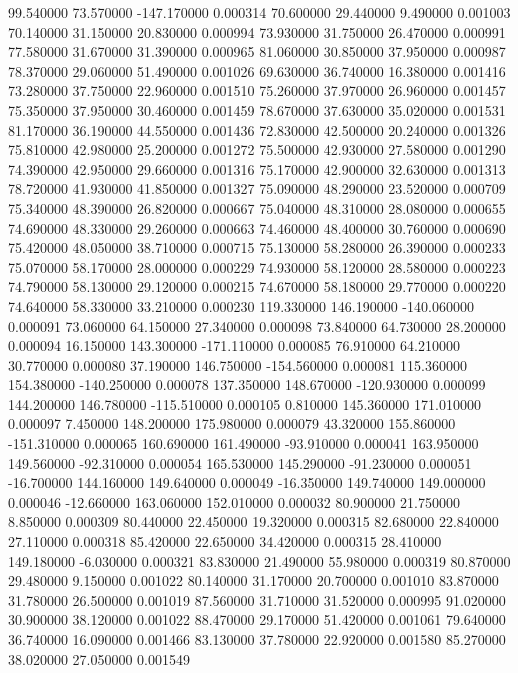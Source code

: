 99.540000 73.570000 -147.170000 0.000314 
70.600000 29.440000 9.490000 0.001003 
70.140000 31.150000 20.830000 0.000994 
73.930000 31.750000 26.470000 0.000991 
77.580000 31.670000 31.390000 0.000965 
81.060000 30.850000 37.950000 0.000987 
78.370000 29.060000 51.490000 0.001026 
69.630000 36.740000 16.380000 0.001416 
73.280000 37.750000 22.960000 0.001510 
75.260000 37.970000 26.960000 0.001457 
75.350000 37.950000 30.460000 0.001459 
78.670000 37.630000 35.020000 0.001531 
81.170000 36.190000 44.550000 0.001436 
72.830000 42.500000 20.240000 0.001326 
75.810000 42.980000 25.200000 0.001272 
75.500000 42.930000 27.580000 0.001290 
74.390000 42.950000 29.660000 0.001316 
75.170000 42.900000 32.630000 0.001313 
78.720000 41.930000 41.850000 0.001327 
75.090000 48.290000 23.520000 0.000709 
75.340000 48.390000 26.820000 0.000667 
75.040000 48.310000 28.080000 0.000655 
74.690000 48.330000 29.260000 0.000663 
74.460000 48.400000 30.760000 0.000690 
75.420000 48.050000 38.710000 0.000715 
75.130000 58.280000 26.390000 0.000233 
75.070000 58.170000 28.000000 0.000229 
74.930000 58.120000 28.580000 0.000223 
74.790000 58.130000 29.120000 0.000215 
74.670000 58.180000 29.770000 0.000220 
74.640000 58.330000 33.210000 0.000230 
119.330000 146.190000 -140.060000 0.000091 
73.060000 64.150000 27.340000 0.000098 
73.840000 64.730000 28.200000 0.000094 
16.150000 143.300000 -171.110000 0.000085 
76.910000 64.210000 30.770000 0.000080 
37.190000 146.750000 -154.560000 0.000081 
115.360000 154.380000 -140.250000 0.000078 
137.350000 148.670000 -120.930000 0.000099 
144.200000 146.780000 -115.510000 0.000105 
0.810000 145.360000 171.010000 0.000097 
7.450000 148.200000 175.980000 0.000079 
43.320000 155.860000 -151.310000 0.000065 
160.690000 161.490000 -93.910000 0.000041 
163.950000 149.560000 -92.310000 0.000054 
165.530000 145.290000 -91.230000 0.000051 
-16.700000 144.160000 149.640000 0.000049 
-16.350000 149.740000 149.000000 0.000046 
-12.660000 163.060000 152.010000 0.000032 
80.900000 21.750000 8.850000 0.000309 
80.440000 22.450000 19.320000 0.000315 
82.680000 22.840000 27.110000 0.000318 
85.420000 22.650000 34.420000 0.000315 
28.410000 149.180000 -6.030000 0.000321 
83.830000 21.490000 55.980000 0.000319 
80.870000 29.480000 9.150000 0.001022 
80.140000 31.170000 20.700000 0.001010 
83.870000 31.780000 26.500000 0.001019 
87.560000 31.710000 31.520000 0.000995 
91.020000 30.900000 38.120000 0.001022 
88.470000 29.170000 51.420000 0.001061 
79.640000 36.740000 16.090000 0.001466 
83.130000 37.780000 22.920000 0.001580 
85.270000 38.020000 27.050000 0.001549 
